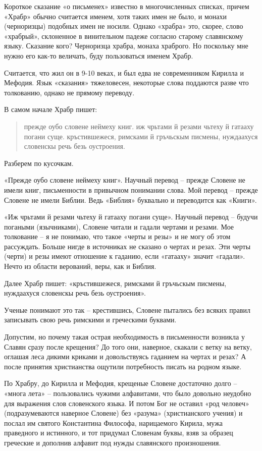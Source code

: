 \documentclass[a5paper,11pt,openany]{article}
\begin{document}
Короткое сказание «о письменех» известно в многочисленных списках, причем «Храбр» обычно считается именем, хотя таких имен не было, и монахи (черноризцы) подобных имен не носили. Однако «храбра» это, скорее, слово «храбрый», склоненное в винительном падеже согласно старому славянскому языку. Сказание кого? Черноризца храбра, монаха храброго. Но поскольку мне нужно его как-то величать, буду пользоваться именем Храбр.

Считается, что жил он в 9-10 веках, и был едва не современником Кирилла и Мефодия. Язык «сказания» тяжеловесен, некоторые слова поддаются разве что толкованию, однако не прямому переводу.

В самом начале Храбр пишет:

\begin{quotation}
прежде оубо словене неймеху книг. иж чрьтами й резами чьтеху й гатааху погани суще. кръстившежеся, римсками й гръчьскым писмены, нуждаахуся словенскы речь безь оустроения.
\end{quotation}

Разберем по кусочкам.

«Прежде оубо словене неймеху книг». Научный перевод – прежде Словене не имели книг, письменности в привычном понимании слова. Мой перевод – прежде Словене не имели Библии. Ведь «Библия» буквально и переводится как «Книги». 

«Иж чрьтами й резами чьтеху й гатааху погани суще». Научный перевод – будучи погаными (язычниками), Словене читали и гадали чертами и резами. Мое толкование – я не понимаю, что такое «черты и резы» и не могу об этом рассуждать. Больше нигде в источниках не сказано о чертах и резах. Эти черты (черти) и резы имеют отношение к гаданию, если «гатааху» значит «гадали». Нечто из области верований, веры, как и Библия.

Далее Храбр пишет: «кръстившежеся, римсками й гръчьскым писмены, нуждаахуся словенскы речь безь оустроения».

Ученые понимают это так – крестившись, Словене пытались без всяких правил записывать свою речь римскими и греческими буквами.

Допустим, но почему такая острая необходимость в письменности возникла у Славян сразу после крещения? До того они, наверное, скакали с ветку на ветку, оглашая леса дикими криками и довольствуясь гаданием на чертах и резах? А после принятия христианства ощутили потребность писать на родном языке.

По Храбру, до Кирилла и Мефодия, крещеные Словене достаточно долго – «многа лета» – пользовались чужими алфавитами, что было довольно неудобно для выражения слов словенского языка. И потом Бог не оставил «род человеч» (подразумеваются наверное Словене) без «разума» (христианского учения) и послал им святого Константина Философа, нарицаемого Кирила, мужа праведного и истинного, и тот придумал Словенам буквы, взяв за образец греческие и дополнив алфавит под нужды славянского произношения.
\end{document}
